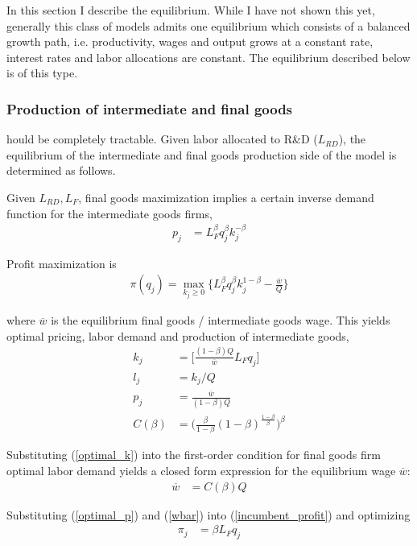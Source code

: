 \documentclass[12pt,english]{article}
\theoremstyle{remark}
\begin{document}
In this section I describe the equilibrium. While I have not shown this yet, generally this class of models admits one equilibrium which consists of a balanced growth path, i.e. productivity, wages and output grows at a constant rate, interest rates and labor allocations are constant. The equilibrium described below is of this type. 

\subsubsection{Production of intermediate and final goods}
hould be completely tractable. 
Given labor allocated to R\&D ($L_{RD}$), the equilibrium of the intermediate and final goods production side of the model is determined as follows. 

Given $L_{RD},L_F$, final goods maximization implies a certain inverse demand function for the intermediate goods firms, 
\begin{align*}
	p_j &= L_F^{\beta} q_j^{\beta} k_j^{-\beta}	
\end{align*}

Profit maximization is
\begin{align}
\pi(q_j) = \max_{k_j \ge 0} \Big\{ L_F^{\beta} q_j^{\beta} k_j^{1-\beta} - \frac{\overline{w}}{Q} \Big\} \label{incumbent_profit}
\end{align}

where $\overline{w}$ is the equilibrium final goods / intermediate goods wage.
This yields optimal pricing, labor demand and production of intermediate goods,
\begin{align}
k_j &= \Big[ \frac{(1-\beta) Q}{\overline{w}} L_F q_j  \Big] \label{optimal_k}\\
l_j &= k_j / Q \label{optimal_l}\\
p_j &= \frac{\overline{w}}{(1-\beta) Q} \label{optimal_p}\\
C(\beta) &= \Big(\frac{\beta}{1-\beta} (1-\beta)^{\frac{1-\beta}{\beta}} \Big)^{\beta} \nonumber
\end{align}

Substituting (\ref{optimal_k}) into the first-order condition for final goods firm optimal labor demand yields a closed form expression for the equilibrium wage $\overline{w}$:
\begin{align}
	\overline{w} &= C(\beta) Q \label{wbar}
\end{align}

Substituting (\ref{optimal_p}) and (\ref{wbar}) into (\ref{incumbent_profit}) and optimizing
\begin{align}
\pi_j &= \beta L_F q_j \label{profits_eq}
\end{align}
\end{document}
